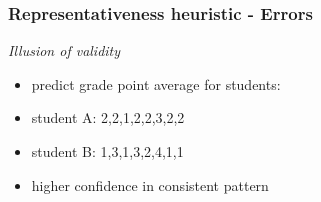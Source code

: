 \documentclass[]{beamer}
\begin{document}
\begin{frame}
 \frametitle{Representativeness heuristic - Errors}
\begin{overlayarea}{110mm}{80mm}
\textit{Illusion of validity}

\begin{itemize}
 \item predict grade point average for students:
 \item student A: 2,2,1,2,2,3,2,2
 \item student B: 1,3,1,3,2,4,1,1
 \item<2->[$\Rightarrow$] higher confidence in consistent pattern
\end{itemize}

\end{overlayarea}
\end{frame}
\end{document}
